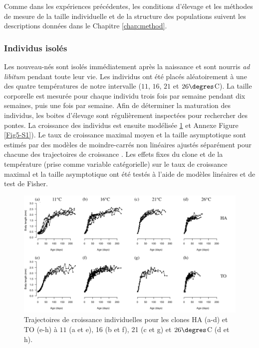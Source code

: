 Comme dans les expériences précédentes, les conditions d'élevage et les méthodes
de mesure de la taille individuelle et de la structure des populations suivent
les descriptions données dans le Chapitre \ref{chap:method}.

\subsubsection{Individus isolés}

Les nouveau-nés sont isolés immédiatement après la naissance et sont nourris
\textit{ad libitum} pendant toute leur vie. Les individus ont été placés
aléatoirement à une des quatre températures de notre intervalle ($11$, $16$, $21$ et
$26\degres$C). La taille corporelle est mesurée pour chaque individu trois fois
par semaine pendant dix semaines, puis une fois par semaine. Afin de déterminer
la maturation des individus, les boites d'élevage sont régulièrement inspectées
pour rechercher des pontes. La croissance des individus est ensuite modélisée
\ref{fig:FIP1} et Annexe Figure \ref{Fig5-S1}).
Le taux de croissance maximal moyen et la taille asymptotique sont estimés par des modèles
de moindre-carrés non linéaires ajustés séparément pour chacune des trajectoires
de croissance \autocites{pinheiro2000a}. Les effets fixes du clone et de la
température (prise comme variable catégorielle) sur le taux de croissance
maximal et la taille asymptotique ont été testés à l'aide de modèles linéaires
et de test de Fisher.

\begin{figure}[!ht]
\begin{center}
\includegraphics[width=\textwidth]{1_CorpsDeThese/Resumes/Fig/FIP01}
\caption[Trajectoires de croissance
individuelles]{Trajectoires de croissance individuelles pour les clones HA
(a-d) et TO (e-h) à $11$ (a et e), 16 (b et f), 21 (c et g) et
$26\degres$C (d et h).}
\label{fig:FIP1}
\end{center}
\end{figure}



